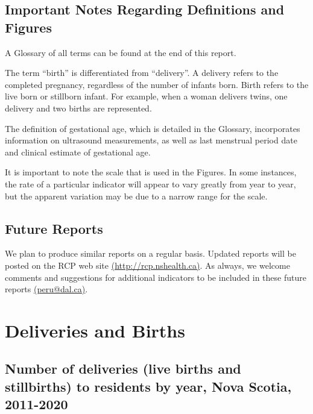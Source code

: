 \documentclass[
]{krantz}
\begin{document}
\hypertarget{important-notes-regarding-definitions-and-figures}{%
\section*{Important Notes Regarding Definitions and Figures}\label{important-notes-regarding-definitions-and-figures}}


A Glossary of all terms can be found at the end of this report.

The term ``birth'' is differentiated from ``delivery''. A delivery refers to the completed pregnancy, regardless of the number of infants born. Birth refers to the live born or stillborn infant. For example, when a woman delivers twins, one delivery and two births are represented.

The definition of gestational age, which is detailed in the Glossary, incorporates information on ultrasound measurements, as well as last menstrual period date and clinical estimate of gestational age.

It is important to note the scale that is used in the Figures. In some instances, the rate of a particular indicator will appear to vary greatly from year to year, but the apparent variation may be due to a narrow range for the scale.

\hypertarget{future-reports}{%
\section*{Future Reports}\label{future-reports}}


We plan to produce similar reports on a regular basis. Updated reports will be posted on the RCP web site \href{http://rcp.nshealth.ca}{(http://rcp.nshealth.ca)}. As always, we welcome comments and suggestions for additional indicators to be included in these future reports \href{peru@dal.ca}{(peru@dal.ca)}.

\mainmatter

\hypertarget{section-1}{%
\chapter{Deliveries and Births}\label{section-1}}

\hypertarget{section-11}{%
\section{Number of deliveries (live births and stillbirths) to residents by year, Nova Scotia, 2011-2020}\label{section-11}}
\end{document}

